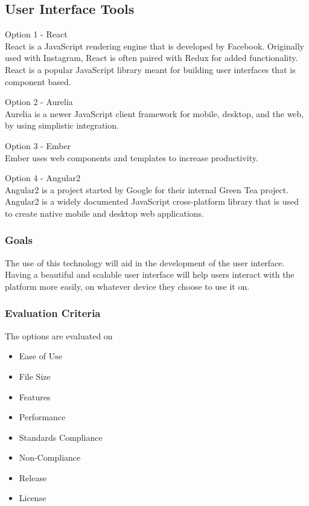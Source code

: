 \documentclass[onecolumn, draftclsnofoot,10pt, compsoc]{IEEEtran}
\begin{document}
{\subsection{User Interface Tools}
\noindent Option 1 - React \cite{React} \\
\noindent React is a JavaScript rendering engine that is developed by Facebook. Originally used with Instagram, React is often paired with Redux for added functionality. React is a popular JavaScript library meant for building user interfaces that is component based. 

\medskip

\noindent Option 2 - Aurelia \cite{Aurelia} \\
\noindent Aurelia is a newer JavaScript client framework for mobile, desktop, and the web, by using simplistic integration.  

\medskip

\noindent Option 3 - Ember \cite{Ember} \\
\noindent Ember uses web components and templates to increase productivity.  

\medskip

\noindent Option 4 - Angular2 \cite{Angular2} \\
\noindent Angular2 is a project started by Google for their internal Green Tea project. Angular2 is a widely documented JavaScript cross-platform library that is used to create native mobile and desktop web applications. 

\medskip
\subsubsection{Goals}
{\noindent The use of this technology will aid in the development of the user interface. Having a beautiful and scalable user interface will help users interact with the platform more easily, on whatever device they choose to use it on. \par}

\medskip

\subsubsection{Evaluation Criteria}
\noindent The options are evaluated on

\begin{itemize}
\item Ease of Use
\item File Size
\item Features
\item Performance
\item Standards Compliance
\item Non-Compliance
\item Release
\item License
\end{itemize}



}
\end{document}
